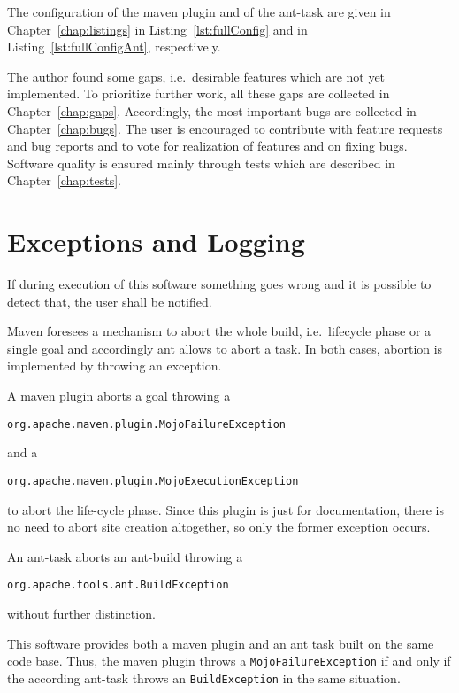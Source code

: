 \documentclass[12pt]{book}
\begin{document}
The configuration of the maven plugin and of the ant-task 
are given in Chapter~\ref{chap:listings}
in Listing~\ref{lst:fullConfig} and in Listing~\ref{lst:fullConfigAnt},
respectively. 

The author found some gaps, i.e.~desirable features 
which are not yet implemented. 
To prioritize further work, 
all these gaps are collected in Chapter~\ref{chap:gaps}. 
Accordingly, the most important bugs are collected in
Chapter~\ref{chap:bugs}. 
The user is encouraged to contribute with feature requests 
and bug reports and to vote for realization of features 
and on fixing bugs. 
Software quality is ensured mainly through tests 
which are described in Chapter~\ref{chap:tests}. 









\chapter{Exceptions and Logging}\label{chap:exceptionLogging}

If during execution of this software something goes wrong 
and it is possible to detect that, the user shall be notified. 

Maven foresees a mechanism to abort the whole build, i.e.~lifecycle phase 
or a single goal and accordingly ant allows to abort a task. 
In both cases, abortion is implemented by throwing an exception. 


A maven plugin aborts a goal throwing a 
%
\begin{verbatim}
org.apache.maven.plugin.MojoFailureException
\end{verbatim}
%
and a 
%
\begin{verbatim}
org.apache.maven.plugin.MojoExecutionException 
\end{verbatim}
%
to abort the life-cycle phase. 
Since this plugin is just for documentation, 
there is no need to abort site creation altogether, 
so only the former exception occurs. 

An ant-task aborts an ant-build throwing a
%
\begin{verbatim}
org.apache.tools.ant.BuildException
\end{verbatim}
%
without further distinction. 

This software provides both a maven plugin and an ant task 
built on the same code base. 
Thus, the maven plugin throws a \texttt{MojoFailureException} 
if and only if the according ant-task throws an \texttt{BuildException} 
in the same situation. 
\end{document}
